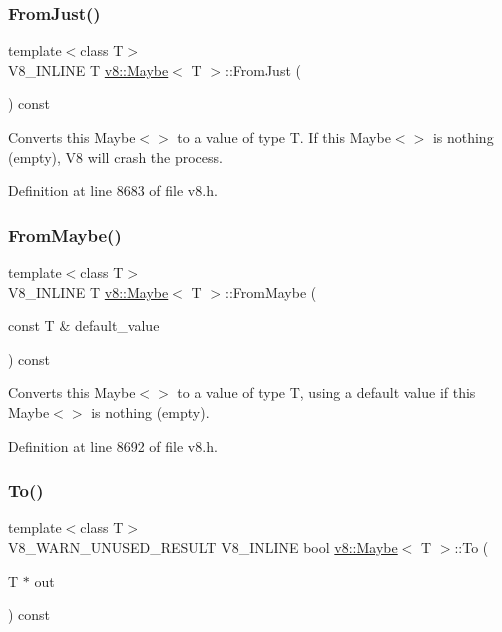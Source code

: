 \subsubsection{\texorpdfstring{From\+Just()}{FromJust()}}
{\footnotesize\ttfamily template$<$class T$>$ \\
V8\+\_\+\+I\+N\+L\+I\+NE T \mbox{\hyperlink{classv8_1_1Maybe}{v8\+::\+Maybe}}$<$ T $>$\+::From\+Just (\begin{DoxyParamCaption}{ }\end{DoxyParamCaption}) const\hspace{0.3cm}{\ttfamily [inline]}}

Converts this Maybe$<$$>$ to a value of type T. If this Maybe$<$$>$ is nothing (empty), V8 will crash the process. 

Definition at line 8683 of file v8.\+h.

\mbox{\label{classv8_1_1Maybe_a4b95361b73d9af3dddd975accca89a5f}} 
\subsubsection{\texorpdfstring{From\+Maybe()}{FromMaybe()}}
{\footnotesize\ttfamily template$<$class T$>$ \\
V8\+\_\+\+I\+N\+L\+I\+NE T \mbox{\hyperlink{classv8_1_1Maybe}{v8\+::\+Maybe}}$<$ T $>$\+::From\+Maybe (\begin{DoxyParamCaption}\item[{const T \&}]{default\+\_\+value }\end{DoxyParamCaption}) const\hspace{0.3cm}{\ttfamily [inline]}}

Converts this Maybe$<$$>$ to a value of type T, using a default value if this Maybe$<$$>$ is nothing (empty). 

Definition at line 8692 of file v8.\+h.

\mbox{\label{classv8_1_1Maybe_a7d1d77e5fd55f125fb4c41db1335bd09}} 
\subsubsection{\texorpdfstring{To()}{To()}}
{\footnotesize\ttfamily template$<$class T$>$ \\
V8\+\_\+\+W\+A\+R\+N\+\_\+\+U\+N\+U\+S\+E\+D\+\_\+\+R\+E\+S\+U\+LT V8\+\_\+\+I\+N\+L\+I\+NE bool \mbox{\hyperlink{classv8_1_1Maybe}{v8\+::\+Maybe}}$<$ T $>$\+::To (\begin{DoxyParamCaption}\item[{T $\ast$}]{out }\end{DoxyParamCaption}) const\hspace{0.3cm}{\ttfamily [inline]}}

